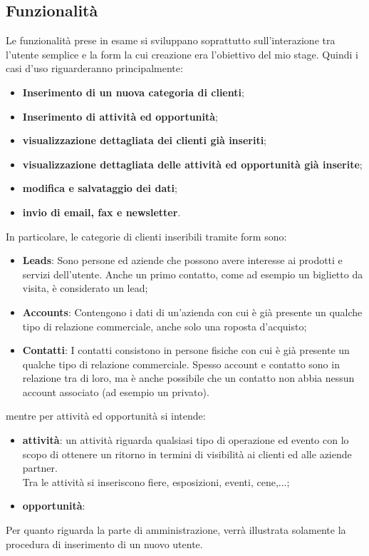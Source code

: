 \subsection{Funzionalità}
Le funzionalità prese in esame si sviluppano soprattutto sull'interazione tra l'utente semplice e la form la cui creazione era l'obiettivo del mio stage.
Quindi i casi d'uso riguarderanno principalmente:
\begin{itemize}
	\item \textbf{Inserimento di un nuova categoria di clienti};
	\item \textbf{Inserimento di attività ed opportunità};
	\item \textbf{visualizzazione dettagliata dei clienti già inseriti};
	\item \textbf{visualizzazione dettagliata delle attività ed opportunità già inserite};
	\item \textbf{modifica e salvataggio dei dati};
	\item \textbf{invio di email, fax e newsletter}.
\end{itemize}
In particolare, le categorie di clienti inseribili tramite form sono:
\begin{itemize}
	\item \textbf{Leads}: Sono persone ed aziende che possono avere interesse ai prodotti e servizi dell'utente. Anche un primo contatto, come ad esempio un biglietto da visita, è considerato un lead;
	\item \textbf{Accounts}: Contengono i dati di un'azienda con cui è già presente un qualche tipo di relazione commerciale, anche solo una roposta d'acquisto;
	\item \textbf{Contatti}: I contatti consistono in persone fisiche con cui è già presente un qualche tipo di relazione commerciale. Spesso account e contatto sono in relazione tra di loro, ma è anche possibile che un contatto non abbia nessun account associato (ad esempio un privato).
\end{itemize}
mentre per attività ed opportunità si intende:
\begin{itemize}
	\item \textbf{attività}: un attività riguarda qualsiasi tipo di operazione ed evento con lo scopo di ottenere un ritorno in termini di visibilità ai clienti ed alle aziende partner.\\
	Tra le attività si inseriscono fiere, esposizioni, eventi, cene,...;
	\item \textbf{opportunità}: %
\end{itemize}
Per quanto riguarda la parte di amministrazione, verrà illustrata solamente la procedura di inserimento di un nuovo utente.

